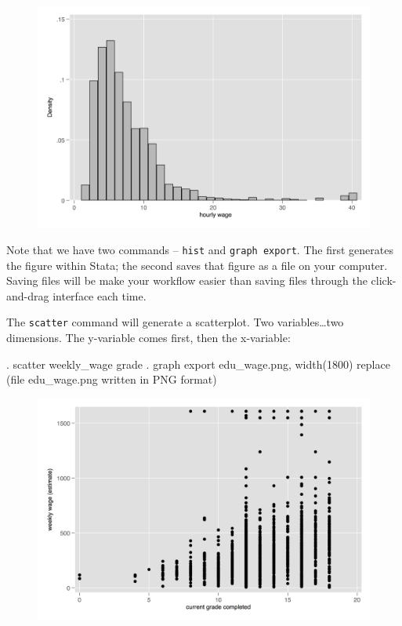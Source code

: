 \documentclass[]{article}
\begin{document}
\begin{figure}
\centering
\includegraphics[width=1.00000\textwidth]{hist_wage.png}
\caption{}
\end{figure}

Note that we have two commands -- \texttt{hist} and
\texttt{graph\ export}. The first generates the figure within Stata; the
second saves that figure as a file on your computer. Saving files will
be make your workflow easier than saving files through the
click-and-drag interface each time.

The \texttt{scatter} command will generate a scatterplot. Two
variables\ldots{}two dimensions. The y-variable comes first, then the
x-variable:

\begin{stlog}
. scatter weekly_wage grade
{\smallskip}
. graph export edu_wage.png, width(1800) replace
(file edu_wage.png written in PNG format)
{\smallskip}
\end{stlog}

\begin{figure}
\centering
\includegraphics[width=1.00000\textwidth]{edu_wage.png}
\caption{}
\end{figure}
\end{document}
